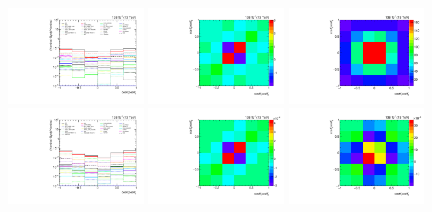 \begin{figure}[htb]
\begin{center}
 \includegraphics[width=0.32\textwidth]{fig_fullRun2UL/unfolding/combined/deltaSystCombinedlog_rebinnedB_c_rr.pdf}
 \includegraphics[width=0.32\textwidth]{fig_fullRun2UL/unfolding/combined/StatCovMatrix_rebinnedB_c_rr.pdf}
 \includegraphics[width=0.32\textwidth]{fig_fullRun2UL/unfolding/combined/TotalSystCovMatrix_rebinnedB_c_rr.pdf} \\
 \includegraphics[width=0.32\textwidth]{fig_fullRun2UL/unfolding/combined/deltaSystCombinedlogNorm_rebinnedB_c_rr.pdf}
 \includegraphics[width=0.32\textwidth]{fig_fullRun2UL/unfolding/combined/StatCovMatrixNorm_rebinnedB_c_rr.pdf}
 \includegraphics[width=0.32\textwidth]{fig_fullRun2UL/unfolding/combined/TotalSystCovMatrixNorm_rebinnedB_c_rr.pdf} \\

\end{center}
\end{figure}
